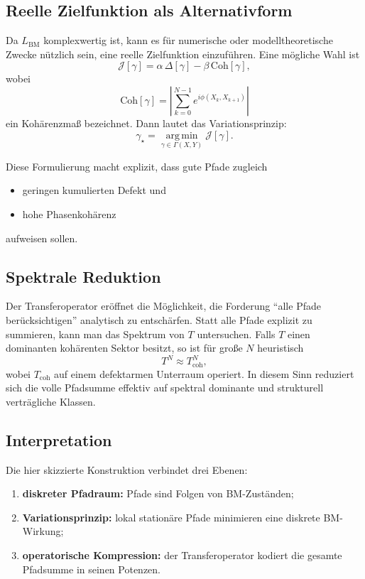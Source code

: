 \documentclass[11pt,a4paper]{article}
\theoremstyle{remark}
\begin{document}
	\subsection{Reelle Zielfunktion als Alternativform}
	
	Da \(L_{\mathrm{BM}}\) komplexwertig ist, kann es für numerische oder modelltheoretische Zwecke nützlich sein, eine reelle Zielfunktion einzuführen. Eine mögliche Wahl ist
	\[
	\mathcal J[\gamma]
	=
	\alpha\,\Delta[\gamma]
	-
	\beta\,\mathrm{Coh}[\gamma],
	\]
	wobei
	\[
	\mathrm{Coh}[\gamma]
	=
	\left|
	\sum_{k=0}^{N-1}e^{i\phi(X_k,X_{k+1})}
	\right|
	\]
	ein Kohärenzmaß bezeichnet. Dann lautet das Variationsprinzip:
	\[
	\gamma_\star
	=
	\operatorname*{arg\,min}_{\gamma\in\Gamma(X,Y)}
	\mathcal J[\gamma].
	\]
	
	Diese Formulierung macht explizit, dass gute Pfade zugleich
	\begin{itemize}
		\item geringen kumulierten Defekt und
		\item hohe Phasenkohärenz
	\end{itemize}
	aufweisen sollen.
	
	\subsection{Spektrale Reduktion}
	
	Der Transferoperator eröffnet die Möglichkeit, die Forderung ``alle Pfade berücksichtigen'' analytisch zu entschärfen. 
	Statt alle Pfade explizit zu summieren, kann man das Spektrum von \(T\) untersuchen. 
	Falls \(T\) einen dominanten kohärenten Sektor besitzt, so ist für große \(N\) heuristisch
	\[
	T^N \approx T_{\mathrm{coh}}^N,
	\]
	wobei \(T_{\mathrm{coh}}\) auf einem defektarmen Unterraum operiert. 
	In diesem Sinn reduziert sich die volle Pfadsumme effektiv auf spektral dominante und strukturell verträgliche Klassen.
	
	\subsection{Interpretation}
	
	Die hier skizzierte Konstruktion verbindet drei Ebenen:
	
	\begin{enumerate}[label=\arabic*)]
		\item \textbf{diskreter Pfadraum:} Pfade sind Folgen von BM-Zuständen;
		\item \textbf{Variationsprinzip:} lokal stationäre Pfade minimieren eine diskrete BM-Wirkung;
		\item \textbf{operatorische Kompression:} der Transferoperator kodiert die gesamte Pfadsumme in seinen Potenzen.
	\end{enumerate}
	
\end{document}

